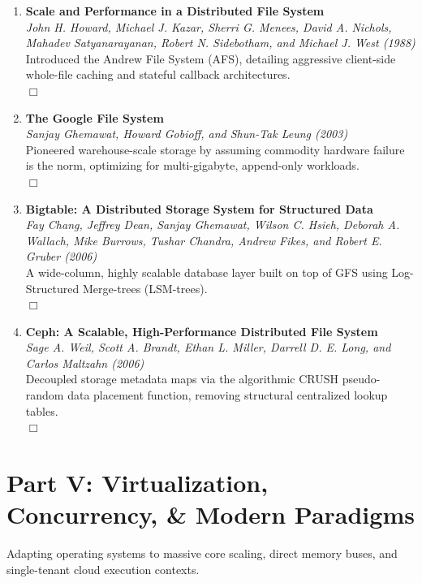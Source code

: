 \documentclass[11pt,a4paper]{article}
\begin{document}
\begin{enumerate}[resume]
    \item \textbf{Scale and Performance in a Distributed File System} \\
    \textit{John H. Howard, Michael J. Kazar, Sherri G. Menees, David A. Nichols, Mahadev Satyanarayanan, Robert N. Sidebotham, and Michael J. West (1988)} \\
    Introduced the Andrew File System (AFS), detailing aggressive client-side whole-file caching and stateful callback architectures. \\
    $\Box$
    
    \item \textbf{The Google File System} \\
    \textit{Sanjay Ghemawat, Howard Gobioff, and Shun-Tak Leung (2003)} \\
    Pioneered warehouse-scale storage by assuming commodity hardware failure is the norm, optimizing for multi-gigabyte, append-only workloads. \\
    $\Box$
    
    \item \textbf{Bigtable: A Distributed Storage System for Structured Data} \\
    \textit{Fay Chang, Jeffrey Dean, Sanjay Ghemawat, Wilson C. Hsieh, Deborah A. Wallach, Mike Burrows, Tushar Chandra, Andrew Fikes, and Robert E. Gruber (2006)} \\
    A wide-column, highly scalable database layer built on top of GFS using Log-Structured Merge-trees (LSM-trees). \\
    $\Box$
    
    \item \textbf{Ceph: A Scalable, High-Performance Distributed File System} \\
    \textit{Sage A. Weil, Scott A. Brandt, Ethan L. Miller, Darrell D. E. Long, and Carlos Maltzahn (2006)} \\
    Decoupled storage metadata maps via the algorithmic CRUSH pseudo-random data placement function, removing structural centralized lookup tables. \\
    $\Box$
\end{enumerate}

\section{Part V: Virtualization, Concurrency, \& Modern Paradigms}
Adapting operating systems to massive core scaling, direct memory buses, and single-tenant cloud execution contexts.
\end{document}
